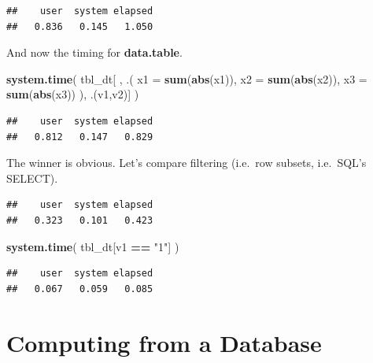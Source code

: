 \documentclass[]{book}
\newenvironment{Shaded}{\begin{snugshade}}{\end{snugshade}}
\newcommand{\DataTypeTok}[1]{\textcolor[rgb]{0.13,0.29,0.53}{#1}}
\newcommand{\KeywordTok}[1]{\textcolor[rgb]{0.13,0.29,0.53}{\textbf{#1}}}
\newcommand{\NormalTok}[1]{#1}
\newcommand{\OperatorTok}[1]{\textcolor[rgb]{0.81,0.36,0.00}{\textbf{#1}}}
\newcommand{\StringTok}[1]{\textcolor[rgb]{0.31,0.60,0.02}{#1}}
\theoremstyle{definition}
\theoremstyle{definition}
\theoremstyle{definition}
\theoremstyle{remark}
\begin{document}
\begin{verbatim}
##    user  system elapsed 
##   0.836   0.145   1.050
\end{verbatim}

And now the timing for \textbf{data.table}.

\begin{Shaded}
\begin{Highlighting}[]
\KeywordTok{system.time}\NormalTok{( }
\NormalTok{  tbl_dt[ ,  .( }\DataTypeTok{x1 =} \KeywordTok{sum}\NormalTok{(}\KeywordTok{abs}\NormalTok{(x1)), }\DataTypeTok{x2 =} \KeywordTok{sum}\NormalTok{(}\KeywordTok{abs}\NormalTok{(x2)), }\DataTypeTok{x3 =} \KeywordTok{sum}\NormalTok{(}\KeywordTok{abs}\NormalTok{(x3)) ), .(v1,v2)]}
\NormalTok{  )}
\end{Highlighting}
\end{Shaded}

\begin{verbatim}
##    user  system elapsed 
##   0.812   0.147   0.829
\end{verbatim}

The winner is obvious.
Let's compare filtering (i.e.~row subsets, i.e.~SQL's SELECT).

\begin{Shaded}
\end{Shaded}

\begin{verbatim}
##    user  system elapsed 
##   0.323   0.101   0.423
\end{verbatim}

\begin{Shaded}
\begin{Highlighting}[]
\KeywordTok{system.time}\NormalTok{( }
\NormalTok{  tbl_dt[v1 }\OperatorTok{==}\StringTok{ "1"}\NormalTok{] }
\NormalTok{  )}
\end{Highlighting}
\end{Shaded}

\begin{verbatim}
##    user  system elapsed 
##   0.067   0.059   0.085
\end{verbatim}

\hypertarget{computing-from-a-database}{%
\section{Computing from a Database}\label{computing-from-a-database}}
\end{document}
